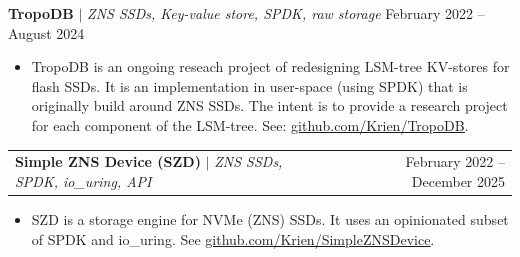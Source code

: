 \documentclass[letterpaper,11pt]{article}
\makeatletter
\newcommand{\resumeItem}[1]{
  \item\small{
    {#1 \vspace{-2pt}}
  }
}
\newcommand{\resumeProjectHeading}[2]{
    \item
    \begin{tabular*}{0.97\textwidth}{l@{\extracolsep{\fill}}r}
      \small#1 & #2 \\
    \end{tabular*}\vspace{-7pt}
}
\newcommand{\resumeItemListStart}{\begin{itemize}[label={}]}
\newcommand{\resumeItemListEnd}{\end{itemize}\vspace{-5pt}}
\makeatother
\begin{document}
      {\textbf{TropoDB} $|$ \emph{ZNS SSDs, Key-value store, SPDK, raw storage}} {February 2022 -- August 2024}
      \resumeItemListStart
        \resumeItem{ TropoDB is an ongoing reseach project of redesigning LSM-tree KV-stores for flash SSDs. It is an implementation in user-space (using SPDK) 
        that is originally build around ZNS SSDs. The intent is to provide a research project for each component of the LSM-tree.
        See: \href{https://github.com/Krien/TropoDB}{\underline{github.com/Krien/TropoDB}}. }
      \resumeItemListEnd
    \resumeProjectHeading
      {\textbf{Simple ZNS Device (SZD)} $|$ \emph{ZNS SSDs, SPDK, io\_uring, API}} {February 2022 -- December 2025}
      \resumeItemListStart
        \resumeItem{SZD is a storage engine for NVMe (ZNS) SSDs. It uses an opinionated subset of SPDK
        and io\_uring. See \href{https://github.com/Krien/SimpleZNSDevice}{\underline{github.com/Krien/SimpleZNSDevice}}.  }
      \resumeItemListEnd
\end{document}
